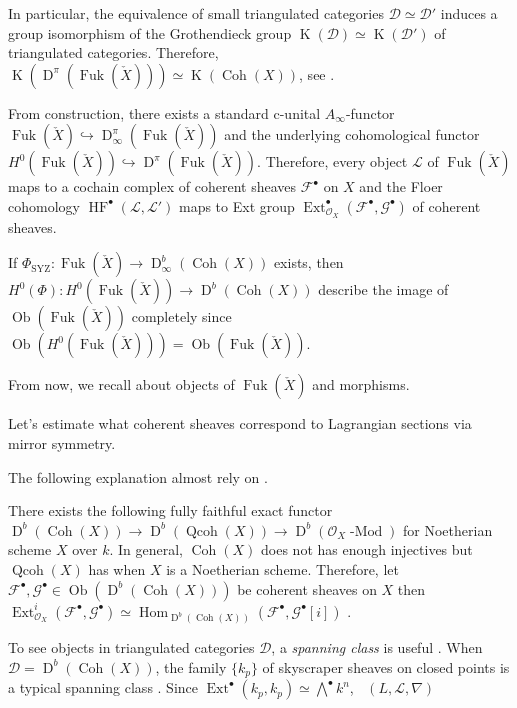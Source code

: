 \documentclass[a4paper,dvipdfmx,reqno,12pt]{amsart}
\makeatletter
\newcommand{\ind}[2]{\emph{#1}\index{1{#2}@{#1}}}
\theoremstyle{definition}
\newcommand{\mcal}[1]{\mathcal{#1}}%
\newcommand{\opn}[1]{\operatorname{#1}}
\newcommand{\hookto}{\hookrightarrow}
\numberwithin{equation}{section}
\makeatother
\begin{document}
In particular, the equivalence of small triangulated categories
$\mcal{D}\simeq \mcal{D}'$ induces a group isomorphism of
the Grothendieck group $\opn{K}(\mcal{D})\simeq \opn{K}(\mcal{D}')$
of triangulated categories.
Therefore, $\opn{K}(\opn{D}^{\pi}(\opn{Fuk}(\check{X})))\simeq \opn{K}(\opn{Coh}(X))$, see \cite[Exercise I.27]{}.

From construction, there exists a standard c-unital $A_{\infty}$-functor $\opn{Fuk}(\check{X})\hookto \opn{D}^{\pi}_{\infty}(\opn{Fuk}(\check{X}))$ and the underlying cohomological functor $H^{0}(\opn{Fuk}(\check{X})) \hookto \opn{D}^{\pi}(\opn{Fuk}(\check{X}))$.
Therefore, every object $\mathscr{L}$ of $\opn{Fuk}(\check{X})$
maps to a cochain complex of coherent sheaves $\mcal{F}^{\bullet}$
on $X$ and the Floer cohomology
$\opn{HF}^{\bullet}(\mathscr{L},\mathscr{L}')$
maps to Ext group
$\opn{Ext}^{\bullet}_{\mcal{O}_X}(\mcal{F}^{\bullet},
  \mcal{G}^{\bullet})$ of coherent sheaves.





If $\Phi_{\opn{SYZ}}: \opn{Fuk}(\check{X})\to \opn{D}^{b}_{\infty}(\opn{Coh}(X))$ exists, then $H^{0}(\Phi): H^{0}(\opn{Fuk}(\check{X}))\to \opn{D}^{b}(\opn{Coh}(X))$
describe the image of $\opn{Ob}(\opn{Fuk}(\check{X}))$ completely since $\opn{Ob}(H^{0}(\opn{Fuk}(\check{X})))=\opn{Ob}(\opn{Fuk}(\check{X}))$.

From now, we recall about objects of $\opn{Fuk}(\check{X})$ and morphisms.

Let's estimate what coherent sheaves correspond to Lagrangian sections via mirror symmetry.

The following explanation almost rely on \cite{MR3848738}.

There exists the following fully faithful exact functor
$\opn{D}^{b}(\opn{Coh}(X))\to \opn{D}^{b}(\opn{Qcoh}(X))\to \opn{D}^{b}(\mcal{O}_X\opn{-Mod})$ for Noetherian scheme $X$ over $k$.
In  general, $\opn{Coh}(X)$ does not has enough injectives
but $\opn{Qcoh}(X)$ has when $X$ is a Noetherian scheme.
Therefore, let $\mcal{F}^{\bullet},\mcal{G}^{\bullet}\in \opn{Ob}(\opn{D}^{b}(\opn{Coh}(X)))$ be coherent sheaves on $X$ then $\opn{Ext}^{i}_{\mcal{O}_X}(\mcal{F}^{\bullet},\mcal{G}^{\bullet})\simeq \opn{Hom}_{\opn{D}^{b}(\opn{Coh}(X))}(\mcal{F}^{\bullet},\mcal{G}^{\bullet}[i])$
\cite[Remark 2.57, 3.7]{MR2244106}.


To see objects in triangulated categories $\mcal{D}$, a \ind{spanning class}{spanning class} is useful \cite[Definition 1.47]{MR2244106}. When $\mcal{D}=\opn{D}^{b}(\opn{Coh}(X))$, the family $\{k_{p}\}$ of skyscraper sheaves on closed points is a typical spanning class \cite[Proposition 3.17]{MR2244106}.
Since $\opn{Ext}^{\bullet}(k_{p},k_p)\simeq \bigwedge^{\bullet}k^{n}$,
$\opn{}(L,\mcal{L},\nabla)$
\end{document}
